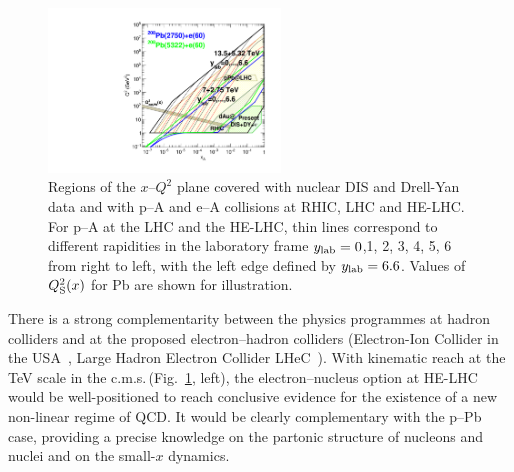 \documentclass[../report.tex]{subfiles}
\begin{document}
\begin{figure}[h]
\centering
\includegraphics[width=0.55\textwidth]{helhc/figs/FHC8.pdf}
\caption{Regions of the $x$--$Q^2$ plane covered %
with nuclear DIS and Drell-Yan data and with p--A and e--A collisions at RHIC, LHC and HE-LHC.
For p--A  at the LHC and the HE-LHC, thin lines correspond to different rapidities in the
laboratory frame $y_{\rm lab} = 0$,1, 2, 3, 4, 5, 6 from right to left, with the left edge defined by $y_{\rm lab} = 6.6$. Values of $Q^2_{\rm S}(x)$ for Pb are shown for illustration.}
\label{fig:kinplane}
\end{figure}


There is a strong complementarity between the physics programmes at hadron colliders
and at the proposed electron--hadron colliders (Electron-Ion Collider in the USA~\cite{Accardi:2012qut}, Large Hadron Electron Collider LHeC~\cite{AbelleiraFernandez:2012cc}).
With kinematic reach at the TeV scale in the c.m.s.\,(Fig.~\ref{fig:kinplane}, left), 
the electron--nucleus option at HE-LHC would be well-positioned to reach conclusive evidence for the existence of a new non-linear regime of QCD. It would be clearly complementary with the p--Pb case, providing a precise knowledge on the partonic structure of nucleons and nuclei and on the small-$x$ dynamics. 



\end{document}
